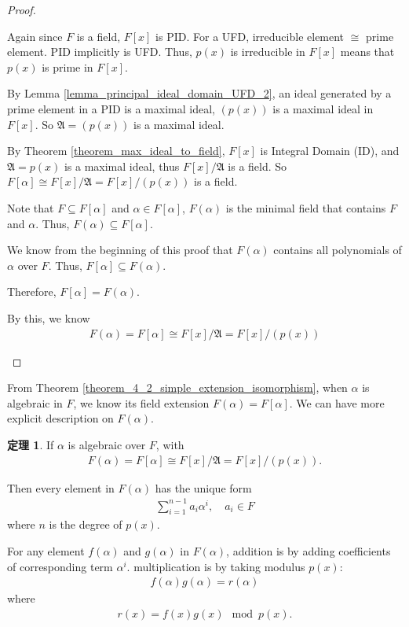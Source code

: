\documentclass[utf8]{ctexbook}
\theoremstyle{definition}
\newtheorem{prototheorem}{定理}[section]
\newenvironment{theorem}
   {\colorlet{shadecolor}{pink!30}\begin{shaded}\begin{prototheorem}}
   {\end{prototheorem}\end{shaded}}
\begin{document}
\begin{proof}
\begin{enumerate}
{Again since $F$ is a field, $F[x]$ is PID. For a UFD, irreducible element $\cong$ prime element. PID implicitly is UFD. Thus, $p(x)$ is irreducible in $F[x]$ means that $p(x)$ is prime in $F[x]$.

By Lemma \ref{lemma_principal_ideal_domain_UFD_2}, an ideal generated by a prime element in a PID is a maximal ideal, $(p(x))$ is a maximal ideal in $F[x]$. So $\mathfrak{A}= (p(x))$ is a maximal ideal.

By Theorem \ref{theorem_max_ideal_to_field}, $F[x]$ is Integral Domain (ID), and $\mathfrak{A} = p(x)$ is a maximal ideal, thus $F[x] / \mathfrak{A}$ is a field. So $F[\alpha] \cong F[x] / \mathfrak{A} = F[x] / (p(x))$ is a field.

Note that $F \subseteq F[\alpha]$ and $\alpha \in F[\alpha]$, $F(\alpha)$ is the minimal field that contains $F$ and $\alpha$. Thus, $F(\alpha) \subseteq F[\alpha]$.

We know from the beginning of this proof that $F(\alpha)$ contains all polynomials of $\alpha$ over $F$. Thus, $F[\alpha] \subseteq F(\alpha)$.

Therefore, $F[\alpha] = F(\alpha)$.

By this, we know
\begin{align*}
F(\alpha) = F[\alpha] \cong F[x] / \mathfrak{A} = F[x] / (p(x))
\end{align*}

}
\end{enumerate}


\end{proof}

From Theorem \ref{theorem_4_2_simple_extension_isomorphism}, when $\alpha$ is algebraic in $F$, we know its field extension $F(\alpha) = F[\alpha]$. We can have more explicit description on $F(\alpha)$.

\begin{theorem}
\label{theorem_4_2_simple_algebraic_extension_explicit}
If $\alpha$ is algebraic over $F$, with
\begin{align*}
F(\alpha) = F[\alpha] \cong F[x] / \mathfrak{A} = F[x] / (p(x)) .
\end{align*}

Then every element in $F(\alpha)$ has the unique form
\begin{align*}
\sum_{i=1} ^{n-1} a_i \alpha^i, \quad a_i \in F
\end{align*}
where $n$ is the degree of $p(x)$.

For any element $f(\alpha)$ and $g(\alpha)$ in $F(\alpha)$, addition is by adding coefficients of corresponding term $\alpha^i$. multiplication is by taking modulus $p(x)$:
\begin{align*}
f(\alpha) g(\alpha) = r(\alpha)
\end{align*}
where
\begin{align*}
r(x) = f(x) g(x) \mod p(x).
\end{align*}
\end{theorem}
\end{document}
